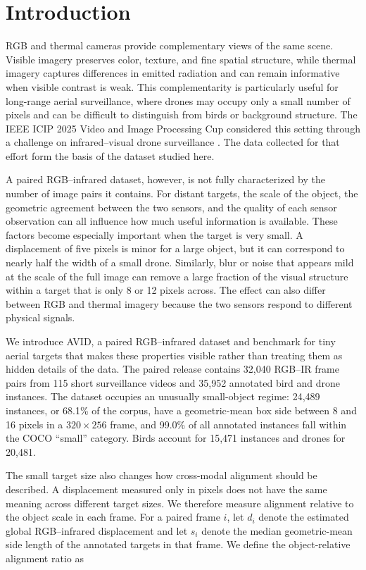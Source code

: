 \documentclass[10pt]{article}
\newcommand{\dataset}{\textsc{AVID}}
\begin{document}
\section{Introduction}

RGB and thermal cameras provide complementary views of the same scene. Visible imagery preserves color, texture, and fine spatial structure, while thermal imagery captures differences in emitted radiation and can remain informative when visible contrast is weak. This complementarity is particularly useful for long-range aerial surveillance, where drones may occupy only a small number of pixels and can be difficult to distinguish from birds or background structure. The IEEE ICIP 2025 Video and Image Processing Cup considered this setting through a challenge on infrared--visual drone surveillance \citep{ieeevipcup2025}. The data collected for that effort form the basis of the dataset studied here.

A paired RGB--infrared dataset, however, is not fully characterized by the number of image pairs it contains. For distant targets, the scale of the object, the geometric agreement between the two sensors, and the quality of each sensor observation can all influence how much useful information is available. These factors become especially important when the target is very small. A displacement of five pixels is minor for a large object, but it can correspond to nearly half the width of a small drone. Similarly, blur or noise that appears mild at the scale of the full image can remove a large fraction of the visual structure within a target that is only 8 or 12 pixels across. The effect can also differ between RGB and thermal imagery because the two sensors respond to different physical signals.

We introduce \dataset{}, a paired RGB--infrared dataset and benchmark for tiny aerial targets that makes these properties visible rather than treating them as hidden details of the data. The paired release contains 32,040 RGB--IR frame pairs from 115 short surveillance videos and 35,952 annotated bird and drone instances. The dataset occupies an unusually small-object regime: 24,489 instances, or 68.1\% of the corpus, have a geometric-mean box side between 8 and 16 pixels in a $320\times256$ frame, and 99.0\% of all annotated instances fall within the COCO ``small'' category. Birds account for 15,471 instances and drones for 20,481.

The small target size also changes how cross-modal alignment should be described. A displacement measured only in pixels does not have the same meaning across different target sizes. We therefore measure alignment relative to the object scale in each frame. For a paired frame $i$, let $d_i$ denote the estimated global RGB--infrared displacement and let $s_i$ denote the median geometric-mean side length of the annotated targets in that frame. We define the object-relative alignment ratio as
\end{document}
